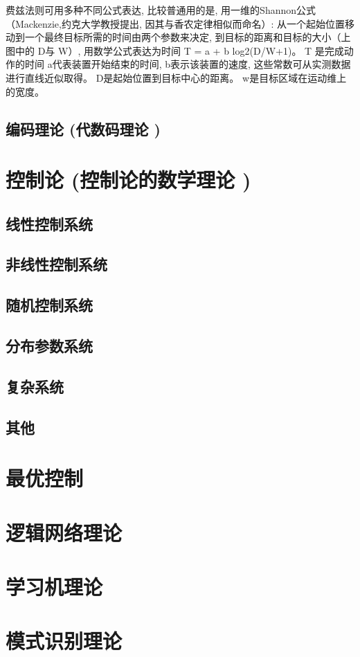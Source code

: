 \documentclass[UTF8]{../09-Mathematics}
\begin{document}
费兹法则可用多种不同公式表达, 比较普通用的是, 用一维的Shannon公式（Mackenzie,约克大学教授提出, 因其与香农定律相似而命名）: 
从一个起始位置移动到一个最终目标所需的时间由两个参数来决定, 到目标的距离和目标的大小（上图中的 D与 W）, 用数学公式表达为时间 T = a + b log2(D/W+1)。
T 是完成动作的时间
a代表装置开始结束的时间, b表示该装置的速度, 这些常数可从实测数据进行直线近似取得。
D是起始位置到目标中心的距离。
w是目标区域在运动维上的宽度。


\section{编码理论 (代数码理论 )}




\chapter{控制论 (控制论的数学理论 )}
    \section{线性控制系统}
    \section{非线性控制系统}
    \section{随机控制系统}
    \section{分布参数系统}
    \section{复杂系统}
    \section{其他}


\chapter{最优控制}
\chapter{逻辑网络理论}
\chapter{学习机理论}
\chapter{模式识别理论}
\end{document}
